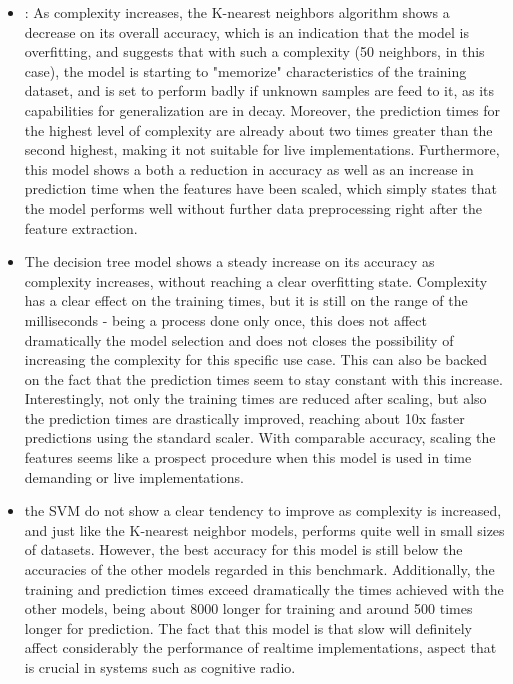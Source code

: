 \begin{itemize}
    \item: As complexity increases, the K-nearest neighbors algorithm shows a decrease on its overall accuracy, which is an indication that the model is overfitting, and suggests that with such a complexity (50 neighbors, in this case), the model is starting to "memorize" characteristics of the training dataset, and is set to perform badly if unknown samples are feed to it, as its capabilities for generalization are in decay. Moreover, the prediction times for the highest level of complexity are already about two times greater than the second highest, making it not suitable for live implementations. Furthermore, this model shows a both a reduction in accuracy as well as an increase in prediction time when the features have been scaled, which simply states that the model performs well without further data preprocessing right after the feature extraction.
    \item The decision tree model shows a steady increase on its accuracy as complexity increases, without reaching a clear overfitting state. Complexity has a clear effect on the training times, but it is still on the range of the milliseconds - being a process done only once, this does not affect dramatically the model selection and does not closes the possibility of increasing the complexity for this specific use case. This can also be backed on the fact that  the prediction times seem to stay constant with this increase. Interestingly, not only the training times are reduced after scaling, but also the prediction times are drastically improved, reaching about 10x faster predictions using the standard scaler. With comparable accuracy, scaling the features seems like a prospect procedure when this model is used in time demanding or live implementations.
    \item the \ac{SVM} do not show a clear tendency to improve as complexity is increased, and just like the K-nearest neighbor models, performs quite well in small sizes of datasets. However, the best accuracy for this model is still below the accuracies of the other models regarded in this benchmark. Additionally, the training and prediction times exceed dramatically the times achieved with the other models, being about 8000 longer for training and around 500 times longer for prediction. The fact that this model is that slow will definitely affect considerably the performance of realtime implementations, aspect that is crucial in systems such as cognitive radio.
\end{itemize}


